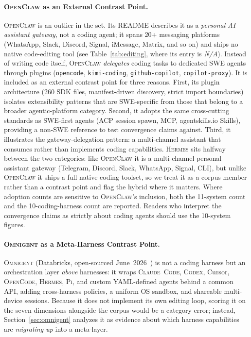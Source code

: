 \documentclass[11pt,a4paper]{article}
\newcommand{\clcode}{\textsc{Claude~Code}\xspace}
\newcommand{\cdx}{\textsc{Codex}\xspace}
\newcommand{\ocl}{\textsc{OpenClaw}\xspace}
\newcommand{\hrm}{\textsc{Hermes}\xspace}
\newcommand{\pib}{\textsc{Pi}\xspace}
\newcommand{\ocd}{\textsc{OpenCode}\xspace}
\newcommand{\omni}{\textsc{Omnigent}\xspace}
\begin{document}
\paragraph{\ocl{} as an External Contrast Point.}
\ocl{} is an outlier in the set.
Its README describes it as a \emph{personal AI assistant gateway}, not a coding agent; it spans 20+ messaging platforms (WhatsApp, Slack, Discord, Signal, iMessage, Matrix, and so on) and ships no native code-editing tool (see Table~\ref{tab:editing}, where its entry is \emph{N/A}).
Instead of writing code itself, \ocl{} \emph{delegates} coding tasks to dedicated SWE agents through plugins (\texttt{opencode}, \texttt{kimi-coding}, \texttt{github-copilot}, \texttt{copilot-proxy}).
It is included as an external contrast point for three reasons.
First, its plugin architecture (260 SDK files, manifest-driven discovery, strict import boundaries) isolates extensibility patterns that are SWE-specific from those that belong to a broader agentic-platform category.
Second, it adopts the same cross-cutting standards as SWE-first agents (ACP session spawn, MCP, agentskills.io Skills), providing a non-SWE reference to test convergence claims against.
Third, it illustrates the gateway-delegation pattern: a multi-channel assistant that consumes rather than implements coding capabilities.
\hrm{} sits halfway between the two categories: like \ocl{} it is a multi-channel personal assistant gateway (Telegram, Discord, Slack, WhatsApp, Signal, CLI), but unlike \ocl{} it ships a full native coding toolset, so we treat it as a corpus member rather than a contrast point and flag the hybrid where it matters.
Where adoption counts are sensitive to \ocl{}'s inclusion, both the 11-system count and the 10-coding-harness count are reported.
Readers who interpret the convergence claims as strictly about coding agents should use the 10-system figures.

\paragraph{\omni{} as a Meta-Harness Contrast Point.}
\omni{} (Databricks, open-sourced June~2026~\cite{omnigent2026}) is not a coding harness but an orchestration layer \emph{above} harnesses: it wraps \clcode{}, \cdx{}, Cursor, \ocd{}, \hrm{}, \pib{}, and custom YAML-defined agents behind a common API, adding cross-harness policies, a uniform OS sandbox, and shareable multi-device sessions.
Because it does not implement its own editing loop, scoring it on the seven dimensions alongside the corpus would be a category error; instead, Section~\ref{sec:omnigent} analyzes it as evidence about which harness capabilities are \emph{migrating up} into a meta-layer.
\end{document}
